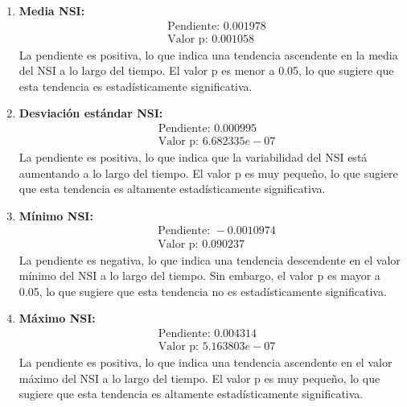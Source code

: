 {\begin{enumerate}
    \item \textbf{Media NSI:}
    \begin{align*}
        &\text{Pendiente: } 0.001978 \\
        &\text{Valor p: } 0.001058
    \end{align*}
    La pendiente es positiva, lo que indica una tendencia ascendente en la media del NSI a lo largo del tiempo. El valor p es menor a 0.05, lo que sugiere que esta tendencia es estadísticamente significativa.\\

    \item \textbf{Desviación estándar NSI:}
    \begin{align*}
        &\text{Pendiente: } 0.000995 \\
        &\text{Valor p: } 6.682335e-07
    \end{align*}
    La pendiente es positiva, lo que indica que la variabilidad del NSI está aumentando a lo largo del tiempo. El valor p es muy pequeño, lo que sugiere que esta tendencia es altamente estadísticamente significativa.\\

    \item \textbf{Mínimo NSI:}
    \begin{align*}
        &\text{Pendiente: } -0.0010974 \\
        &\text{Valor p: } 0.090237
    \end{align*}
    La pendiente es negativa, lo que indica una tendencia descendente en el valor mínimo del NSI a lo largo del tiempo. Sin embargo, el valor p es mayor a 0.05, lo que sugiere que esta tendencia no es estadísticamente significativa.\\

    \item \textbf{Máximo NSI:}
    \begin{align*}
        &\text{Pendiente: } 0.004314 \\
        &\text{Valor p: } 5.163803e-07
    \end{align*}
    La pendiente es positiva, lo que indica una tendencia ascendente en el valor máximo del NSI a lo largo del tiempo. El valor p es muy pequeño, lo que sugiere que esta tendencia es altamente estadísticamente significativa.\\
\end{enumerate}
}

